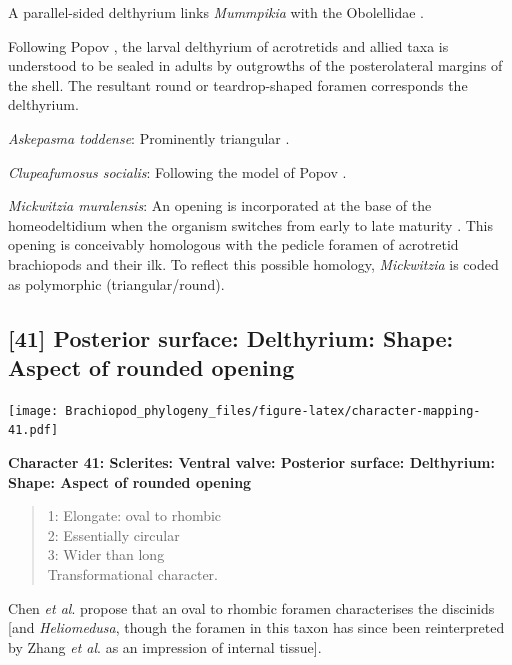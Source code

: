 \documentclass[]{book}
\theoremstyle{definition}
\theoremstyle{definition}
\theoremstyle{definition}
\theoremstyle{remark}
\begin{document}
A parallel-sided delthyrium links \emph{Mummpikia} with the Obolellidae
\citep{Balthasar2008iMummpikia}.

Following Popov \citeyearpar{Popov1992TheCambrian}, the larval
delthyrium of acrotretids and allied taxa is understood to be sealed in
adults by outgrowths of the posterolateral margins of the shell. The
resultant round or teardrop-shaped foramen corresponds the delthyrium.

\emph{Askepasma toddense}: Prominently triangular \citep[see][fig.
2]{Topper2013Theoldest}.

\emph{Clupeafumosus socialis}: Following the model of Popov
\citeyearpar{Popov1992TheCambrian}.

\emph{Mickwitzia muralensis}: An opening is incorporated at the base of
the homeodeltidium when the organism switches from early to late
maturity \citep[fig. 10 in][]{Balthasar2004Shellstructure}. This opening
is conceivably homologous with the pedicle foramen of acrotretid
brachiopods and their ilk. To reflect this possible homology,
\emph{Mickwitzia} is coded as polymorphic (triangular/round).

\hypertarget{posterior-surface-delthyrium-shape-aspect-of-rounded-opening}{%
\subsection*{{[}41{]} Posterior surface: Delthyrium: Shape: Aspect of
rounded
opening}\label{posterior-surface-delthyrium-shape-aspect-of-rounded-opening}}

\texttt{[image: Brachiopod\_phylogeny\_files/figure-latex/character-mapping-41.pdf]}

\textbf{Character 41: Sclerites: Ventral valve: Posterior surface:
Delthyrium: Shape: Aspect of rounded opening}

\begin{quote}
1: Elongate: oval to rhombic\\
2: Essentially circular\\
3: Wider than long\\
Transformational character.
\end{quote}

Chen \emph{et al}. \citeyearpar{Chen2007Reinterpretationof} propose that
an oval to rhombic foramen characterises the discinids {[}and
\emph{Heliomedusa}, though the foramen in this taxon has since been
reinterpreted by Zhang \emph{et al}.
\citeyearpar{Zhang2009Architectureand} as an impression of internal
tissue{]}.
\end{document}
